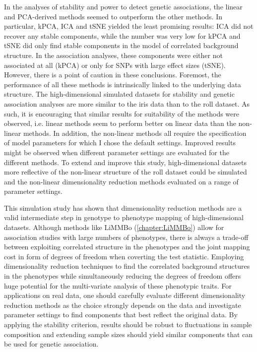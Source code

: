In the analyses of stability and power to detect genetic associations, the linear and PCA-derived methods seemed to outperform the other methods. In particular, kPCA, ICA and tSNE yielded the least promising results: ICA did not recover any stable components, while the number was very low for kPCA and tSNE did only find stable components in the model of correlated background structure. In the association analyses, these components were either not associated at all (kPCA) or only for SNPs with large effect sizes (tSNE). However, there is a point of caution in these conclusions. Foremost, the performance of all these methods is intrinsically linked to the underlying data structure. The high-dimensional simulated datasets for stability and genetic association analyses are more similar to the iris data than to the roll dataset. As such, it is encouraging that similar results for suitability of the methods were observed, i.e. linear methods seem to perform better on linear data than the non-linear methods. In addition, the non-linear methods all require the specification of model parameters for which I chose the default settings. Improved results might be observed when different parameter settings are evaluated for the different methods. To extend and improve this study, high-dimensional datasets more reflective of the non-linear structure of the roll dataset could be simulated and the non-linear dimensionality reduction methods evaluated on a range of parameter settings. 

This simulation study has shown that dimensionality reduction methods are a valid intermediate step in genotype to phenotype mapping of high-dimensional datasets. Although methods like LiMMBo (\cref{chapter:LiMMBo}) allow for  association studies with large numbers of phenotypes, there is always a trade-off between exploiting correlated structure in the phenotypes and the joint mapping cost in form of degrees of freedom when coverting the test statistic. Employing dimensionality reduction techniques to find the correlated background structures in the phenotypes while simultaneously reducing the degrees of freedom offers huge potential for the multi-variate analysis of these phenotypic traits. For applications on real data, one should carefully evaluate different dimensionality reduction methods as the choice strongly depends on the data and investigate parameter settings to find components that best reflect the original data. By applying the stability criterion, results should be robust to fluctuations in sample composition and extending sample sizes should yield similar components that can be used for genetic association. 



